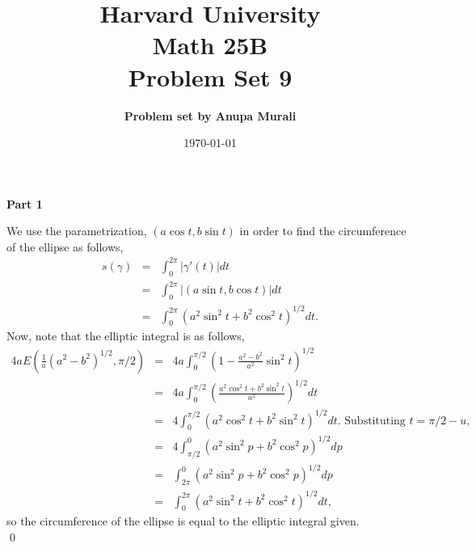 \documentclass[12pt]{article}
\title{\bf \large Harvard University \\ Math 25B \\ \vspace{0.2in} Problem Set 9}
\author{ \bf \large Problem set by  Anupa Murali}
\date{\today}
\newcommand{\problem}[1]{\vspace{0.3in} \noindent {\bf Problem #1}}
\begin{document}
\maketitle

\thispagestyle{empty}



\vspace{0.35in}

\centerline{\bf \large Part 1}

\problem{1} 
We use the parametrization, $(a\cos t, b\sin t)$ in order to find the circumference of the ellipse as follows,
\begin{eqnarray*}
s(\gamma) &=& \int_0^{2\pi} |\gamma'(t)| dt\\
&=& \int_0^{2\pi}|(a\sin t, b\cos t)|dt\\
&=& \int_0^{2\pi}(a^2\sin^2t + b^2 \cos^2t)^{1/2}dt.
\end{eqnarray*}
Now, note that the elliptic integral is as follows,
\begin{eqnarray*}
4aE\left( \frac{1}{a}(a^2-b^2)^{1/2},\pi/2 \right) &=& 4a \int_0^{\pi/2} \left(1-\frac{a^2-b^2}{a^2} \sin^2t \right)^{1/2}\\
&=& 4a \int_0^{\pi/2} \left(\frac{a^2\cos^2 t + b^2 \sin^2 t}{a^2}\right)^{1/2}dt\\
&=& 4\int_0^{\pi/2} (a^2\cos^2t + b^2\sin^2t)^{1/2}dt. \text{ Substituting } t = \pi/2 - u,\\
&=& 4\int_{\pi/2}^0 (a^2\sin^2p + b^2 \cos^2p)^{1/2}dp\\
&=& \int_{2\pi}^0 (a^2\sin^2p + b^2 \cos^2p)^{1/2}dp\\
&=&  \int_0^{2\pi}(a^2\sin^2t + b^2 \cos^2t)^{1/2}dt,
\end{eqnarray*}
so the circumference of the ellipse is equal to the elliptic integral given.\\
\qed
\end{document}
